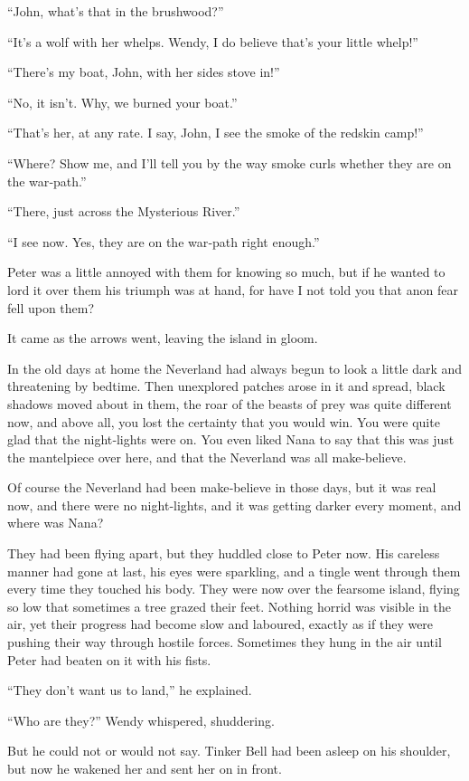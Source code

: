 “John, what’s that in the brushwood?”

“It’s a wolf with her whelps.
Wendy, I do believe that’s your little whelp!”

“There’s my boat, John, with her sides stove in!”

“No, it isn’t.
Why, we burned your boat.”

“That’s her, at any rate.
I say, John, I see the smoke of the redskin camp!”

“Where?
Show me, and I’ll tell you by the way smoke curls whether they are on the war‐path.”

“There, just across the Mysterious River.”

“I see now.
Yes, they are on the war‐path right enough.”

Peter was a little annoyed with them for knowing so much,
but if he wanted to lord it over them his triumph was at hand,
for have I not told you that anon fear fell upon them?

It came as the arrows went, leaving the island in gloom.

In the old days at home the Neverland had always begun to look a little dark and threatening by bedtime.
Then unexplored patches arose in it and spread, black shadows moved about in them,
the roar of the beasts of prey was quite different now,
and above all, you lost the certainty that you would win.
You were quite glad that the night‐lights were on.
You even liked Nana to say that this was just the mantelpiece over here,
and that the Neverland was all make‐believe.

Of course the Neverland had been make‐believe in those days,
but it was real now, and there were no night‐lights,
and it was getting darker every moment, and where was Nana?

They had been flying apart, but they huddled close to Peter now.
His careless manner had gone at last,
his eyes were sparkling, and a tingle went through them every time they touched his body.
They were now over the fearsome island, flying so low that sometimes a tree grazed their feet.
Nothing horrid was visible in the air,
yet their progress had become slow and laboured,
exactly as if they were pushing their way through hostile forces.
Sometimes they hung in the air until Peter had beaten on it with his fists.

“They don’t want us to land,” he explained.

“Who are they?\@” Wendy whispered, shuddering.

But he could not or would not say.
Tinker Bell had been asleep on his shoulder,
but now he wakened her and sent her on in front.

